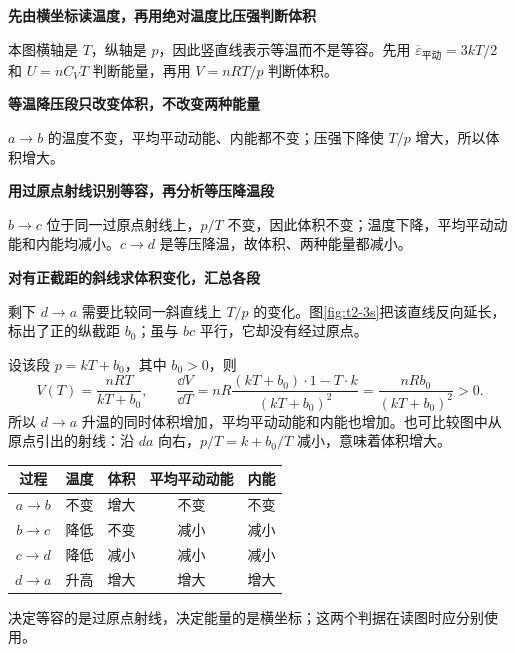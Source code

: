 \begin{solution}\textbf{先由横坐标读温度，再用绝对温度比压强判断体积}\par\nobreak
本图横轴是 $T$，纵轴是 $p$，因此竖直线表示等温而不是等容。先用 $\overline\varepsilon_{\text{平动}}=3kT/2$ 和 $U=nC_VT$ 判断能量，再用 $V=nRT/p$ 判断体积。


\par\medskip{}\noindent\textbf{等温降压段只改变体积，不改变两种能量}\par\nobreak
$a\to b$ 的温度不变，平均平动动能、内能都不变；压强下降使 $T/p$ 增大，所以体积增大。

\par\medskip{}\noindent\textbf{用过原点射线识别等容，再分析等压降温段}\par\nobreak
$b\to c$ 位于同一过原点射线上，$p/T$ 不变，因此体积不变；温度下降，平均平动动能和内能均减小。$c\to d$ 是等压降温，故体积、两种能量都减小。


\par\medskip{}\noindent\textbf{对有正截距的斜线求体积变化，汇总各段}\par\nobreak
剩下 $d\to a$ 需要比较同一斜直线上 $T/p$ 的变化。图\ref{fig:t2-3s}把该直线反向延长，标出了正的纵截距 $b_0$；虽与 $bc$ 平行，它却没有经过原点。

设该段 $p=kT+b_0$，其中 $b_0>0$，则
\[V(T)=\frac{nRT}{kT+b_0},\qquad
\frac{\dd V}{\dd T}
=nR\frac{(kT+b_0)\cdot1-T\cdot k}{(kT+b_0)^2}
=\frac{nRb_0}{(kT+b_0)^2}>0.\]
所以 $d\to a$ 升温的同时体积增加，平均平动动能和内能也增加。也可比较图中从原点引出的射线：沿 $da$ 向右，$p/T=k+b_0/T$ 减小，意味着体积增大。
\begin{center}\small\begin{tabular}{ccccc}\toprule 过程&温度&体积&平均平动动能&内能\\\midrule $a\to b$&不变&增大&不变&不变\\$b\to c$&降低&不变&减小&减小\\$c\to d$&降低&减小&减小&减小\\$d\to a$&升高&增大&增大&增大\\\bottomrule\end{tabular}\end{center}
决定等容的是过原点射线，决定能量的是横坐标；这两个判据在读图时应分别使用。
\end{solution}
